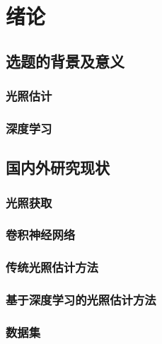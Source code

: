 \chapter{绪论}\label{chap:introduction}

\section{选题的背景及意义}

\subsection{光照估计}
\subsection{深度学习}

\section{国内外研究现状}
\subsection{光照获取}
\subsection{卷积神经网络}
\subsection{传统光照估计方法}
\subsection{基于深度学习的光照估计方法}
\subsection{数据集}
